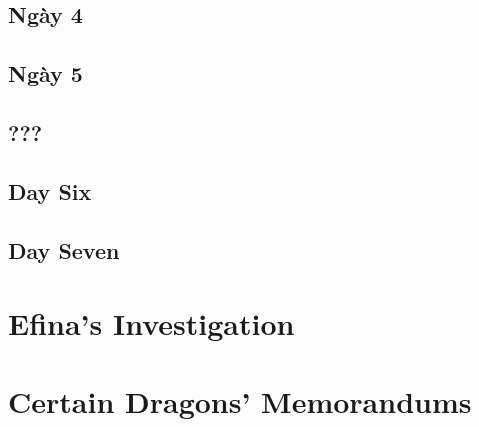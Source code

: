 \documentclass[13pt]{extarticle}
\begin{document}
	\subsection*{Ngày 4}
	
	
	\subsection*{Ngày 5}
	
	
	\subsection*{???}
	

	\subsection*{Day Six}

	\subsection*{Day Seven}

	
	\section{Efina’s Investigation}
	
	\section{Certain Dragons’ Memorandums}
	
	
\end{document}
